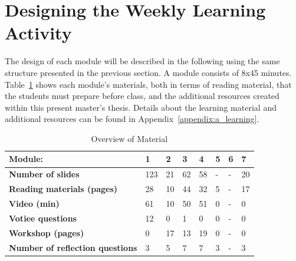\section{Designing the Weekly Learning Activity}

\noindent
The design of each module will be described in the following using the same structure presented in the previous section. A module consists of 8x45 minutes. Table~\ref{table:material} shows each module's materials, both in terms of reading material, that the students must prepare before class, and the additional resources created within this present master's thesis. Details about the learning material and additional resources can be found in Appendix~\ref{appendix:a_learning}.

\renewcommand*{\arraystretch}{1.8}
\begin{table}[]
\centering

\begin{tabular}{|p{5cm}|p{1cm}|p{1cm}|p{1cm}|p{1cm}|p{1cm}|p{1cm}|p{1cm}|}
\hline
\rowcolor[HTML]{EFEFEF} 
\textbf{Module:}                        & \textbf{1} & \textbf{2} & \textbf{3} & \textbf{4} & \textbf{5} & \multicolumn{1}{l|}{\cellcolor[HTML]{EFEFEF}\textbf{6}} & \textbf{7} \\ \hline
\textbf{Number of slides}               & 123        & 21           & 62           &  58          &   -         &  -                              &  20           \\ \hline
\textbf{Reading materials (pages)}      & 28         & 10           & 44           & 32           & 5           &  -                              &  17          \\ \hline
\textbf{Video (min)}                    & 61         &  10          & 50           & 51           &  0          & -                                & 0           \\ \hline
\textbf{Votiee questions}               & 12         & 0           &  1          & 0           &  0          &   -                             & 0           \\ \hline
\textbf{Workshop (pages)}               & 0          & 17           &  13          & 19           & 0           &  -                              &  0          \\ \hline
\textbf{Number of reflection questions} & 3          & 5           &  7          & 7           & 3           &  -                      & 3           \\ \hline
\end{tabular}
\caption{Overview of Material}
\label{table:material}
\end{table}



